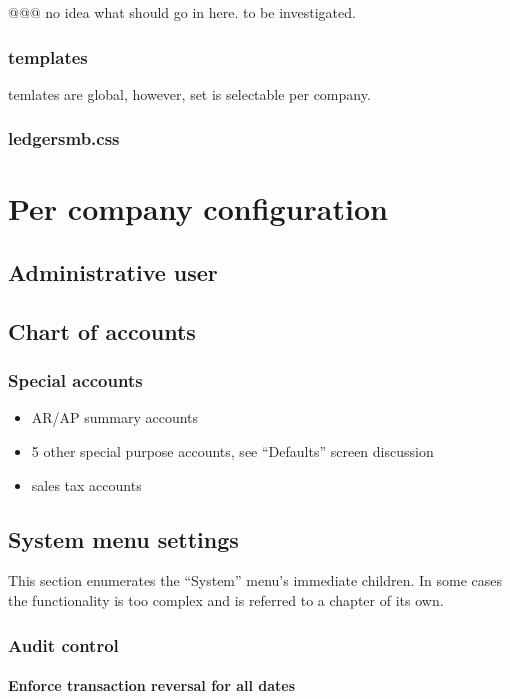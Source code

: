 \documentclass[10pt,A4]{book}
\begin{document}
@@@ no idea what should go in here. to be investigated.

\subsection{templates}

temlates are global, however, set is selectable per company.

\subsection{ledgersmb.css}

\chapter{Per company configuration}

\section{Administrative user}
\section{Chart of accounts}
\subsection{Special accounts}
\begin{itemize}
\item AR/AP summary accounts
\item 5 other special purpose accounts, see ``Defaults'' screen discussion
\item sales tax accounts
\end{itemize}


\section{System menu settings}

This section enumerates the ``System'' menu's immediate children. In some cases the
functionality is too complex and is referred to a chapter of its own.

\subsection{Audit control}

\subsubsection{Enforce transaction reversal for all dates}
\end{document}
